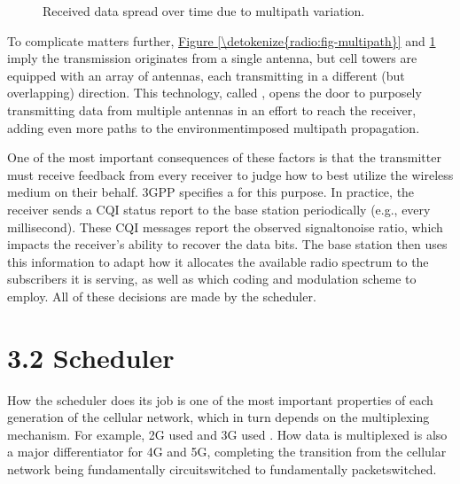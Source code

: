 \documentclass[a4paper,11pt,english]{sphinxmanual}
\let\sphinxpxdimen\pdfpxdimen\else\newdimen\sphinxpxdimen
\begin{document}
\begin{figure}[ht]
\centering
\capstart

\noindent\sphinxincludegraphics[width=500\sphinxpxdimen]{{Slide16}.png}
\caption{Received data spread over time due to multipath
variation.}\label{\detokenize{radio:id7}}\label{\detokenize{radio:fig-coherence}}\end{figure}

\sphinxAtStartPar
To complicate matters further,
\hyperref[\detokenize{radio:fig-multipath}]{Figure \ref{\detokenize{radio:fig-multipath}}} and \hyperref[\detokenize{radio:fig-coherence}]{\ref{\detokenize{radio:fig-coherence}}} imply
the transmission originates from a single
antenna, but cell towers are equipped with an array of antennas, each
transmitting in a different (but overlapping) direction. This
technology, called , opens the
door to purposely transmitting data from multiple antennas in an effort
to reach the receiver, adding even more paths to the environment\sphinxhyphen{}imposed
multipath propagation.

\sphinxAtStartPar
One of the most important consequences of these factors is that the
transmitter must receive feedback from every receiver to judge how to
best utilize the wireless medium on their behalf. 3GPP specifies a
 for this purpose. In practice,
the receiver sends a CQI status report to the base station periodically
(e.g., every millisecond). These CQI messages report the observed
signal\sphinxhyphen{}to\sphinxhyphen{}noise ratio, which impacts the receiver’s ability to recover
the data bits. The base station then uses this information to adapt how
it allocates the available radio spectrum to the subscribers it is
serving, as well as which coding and modulation scheme to employ.
All of these decisions are made by the scheduler.


\section{3.2 Scheduler}
\label{\detokenize{radio:scheduler}}
\sphinxAtStartPar
How the scheduler does its job is one of the most important properties
of each generation of the cellular network, which in turn depends on
the multiplexing mechanism. For example, 2G used  and 3G used . How data is multiplexed is also a major differentiator for 4G
and 5G, completing the transition from the cellular network being
fundamentally circuit\sphinxhyphen{}switched to fundamentally packet\sphinxhyphen{}switched.
\end{document}
